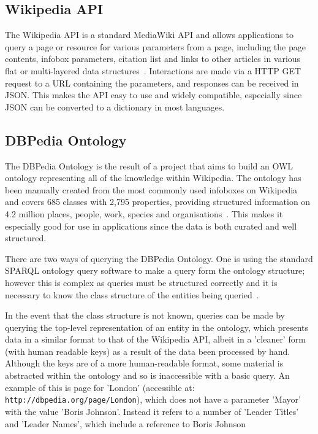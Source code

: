 \documentclass[authoryearcitations]{UoYCSproject}
\begin{document}
\subsection{Wikipedia API}
The Wikipedia API is a standard MediaWiki API and allows applications to query a page or resource for various parameters from a page, including the page contents, infobox parameters, citation list and links to other articles in various flat or multi-layered data structures~\cite{mediaWikiAPI}.  Interactions are made via a HTTP GET request to a URL containing the parameters, and responses can be received in JSON.  This makes the API easy to use and widely compatible, especially since JSON can be converted to a dictionary in most languages.

\subsection{DBPedia Ontology}
The DBPedia Ontology is the result of a project that aims to build an OWL ontology representing all of the knowledge within Wikipedia.  The ontology has been manually created from the most commonly used infoboxes on Wikipedia and covers 685 classes with 2,795 properties, providing structured information on 4.2 million places, people, work, species and organisations~\cite{dbPediaIntro}.  This makes it especially good for use in applications since the data is both curated and well structured.

There are two ways of querying the DBPedia Ontology.  One is using the standard SPARQL ontology query software to make a query form the ontology structure; however this is complex as queries must be structured correctly and it is necessary to know the class structure of the entities being queried~\cite{dbPediaSparql}.

In the event that the class structure is not known, queries can be made by querying the top-level representation of an entity in the ontology, which presents data in a similar format to that of the Wikipedia API, albeit in a 'cleaner' form (with human readable keys) as a result of the data been processed by hand.  Although the keys are of a more human-readable format, some material is abstracted within the ontology and so is inaccessible with a basic query.  An example of this is page for 'London' (accessible at: \texttt{http://dbpedia.org/page/London}), which does not have a parameter 'Mayor' with the value 'Boris Johnson'.  Instead it refers to a number of 'Leader Titles' and 'Leader Names', which include a reference to Boris Johnson
\end{document}
